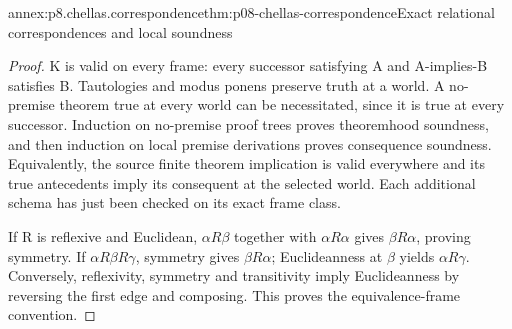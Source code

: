 \begin{annexitem}{annex:p8.chellas.correspondence}{thm:p08-chellas-correspondence}{Exact relational correspondences and local soundness}
\begin{proof}
K is valid on every frame: every successor satisfying A and A-implies-B
satisfies B. Tautologies and modus ponens preserve truth at a world.
A no-premise theorem true at every world can be necessitated, since it
is true at every successor. Induction on no-premise proof trees proves
theoremhood soundness, and then induction on local premise derivations
proves consequence soundness. Equivalently, the source finite theorem
implication is valid everywhere and its true antecedents imply its
consequent at the selected world. Each additional schema has just been
checked on its exact frame class.

If R is reflexive and Euclidean, \(\alpha R\beta\) together with
\(\alpha R\alpha\) gives \(\beta R\alpha\), proving symmetry.
If \(\alpha R\beta R\gamma\), symmetry gives
\(\beta R\alpha\); Euclideanness at \(\beta\) yields
\(\alpha R\gamma\). Conversely, reflexivity, symmetry and
transitivity imply Euclideanness by reversing the first edge and
composing. This proves the equivalence-frame convention.
\end{proof}
\end{annexitem}

